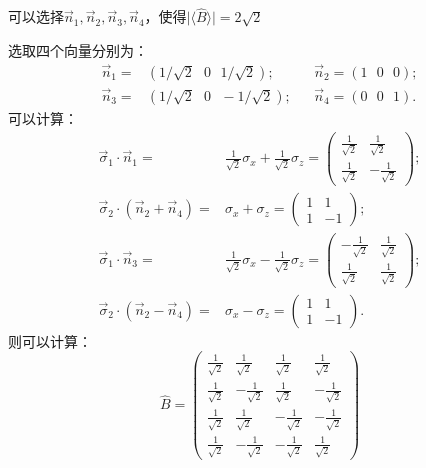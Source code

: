 \documentclass[reqno,a4paper,12pt]{amsart}
\begin{document}
可以选择$\vec{n}_1, \vec{n}_2, \vec{n}_3, \vec{n}_4$，使得$\vert \langle \hat{B} \rangle \vert = 2\sqrt{2}$
\begin{tcolorbox}[breakable, colback = black!5!white, colframe = black]
选取四个向量分别为：
\begin{align*}
	\vec{n}_1 =& (1/\sqrt{2} \ \ \ 0 \ \ \ 1/\sqrt{2});& & \vec{n}_2 = (1 \ \ \ 0 \ \ \ 0); \\
	\vec{n}_3 =& (1/\sqrt{2} \ \ \ 0 \ \ \ -1/\sqrt{2});& & \vec{n}_4 = (0 \ \ \ 0 \ \ \ 1).
\end{align*}
可以计算：
\begin{align*}
	\vec{\sigma}_1 \cdot \vec{n}_1 =& \frac{1}{\sqrt{2}}\sigma_x+\frac{1}{\sqrt{2}}\sigma_z = \left( \begin{matrix}
		\frac{1}{\sqrt{2}} & \frac{1}{\sqrt{2}} \\
		\frac{1}{\sqrt{2}} & -\frac{1}{\sqrt{2}}
	\end{matrix} \right); \\
	\vec{\sigma}_2 \cdot (\vec{n}_2+\vec{n}_4) =& \sigma_x+\sigma_z = \left( \begin{matrix}
		1 & 1 \\
		1 & -1
	\end{matrix} \right); \\
	\vec{\sigma}_1 \cdot \vec{n}_3 =& \frac{1}{\sqrt{2}}\sigma_x-\frac{1}{\sqrt{2}}\sigma_z = \left( \begin{matrix}
		-\frac{1}{\sqrt{2}} & \frac{1}{\sqrt{2}} \\
		\frac{1}{\sqrt{2}} & \frac{1}{\sqrt{2}}
	\end{matrix} \right); \\
	\vec{\sigma}_2 \cdot (\vec{n}_2-\vec{n}_4) =& \sigma_x-\sigma_z = \left( \begin{matrix}
		1 & 1 \\
		1 & -1
	\end{matrix} \right).
\end{align*}
则可以计算：
\[
	\hat{B} = \left( \begin{matrix}
		\frac{1}{\sqrt{2}} & \frac{1}{\sqrt{2}} & \frac{1}{\sqrt{2}} & \frac{1}{\sqrt{2}} \\
		\frac{1}{\sqrt{2}} & -\frac{1}{\sqrt{2}} & \frac{1}{\sqrt{2}} & -\frac{1}{\sqrt{2}} \\
		\frac{1}{\sqrt{2}} & \frac{1}{\sqrt{2}} & -\frac{1}{\sqrt{2}} & -\frac{1}{\sqrt{2}} \\
		\frac{1}{\sqrt{2}} & -\frac{1}{\sqrt{2}} & -\frac{1}{\sqrt{2}} & \frac{1}{\sqrt{2}}
	\end{matrix} \right) 
\]
\end{tcolorbox}
\end{document}
